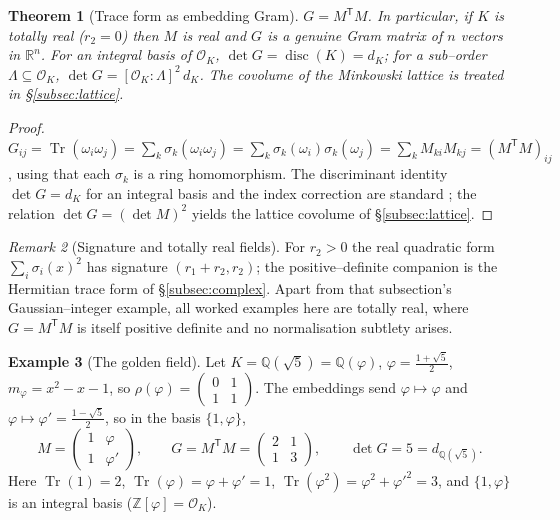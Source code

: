 \documentclass[11pt]{article}
\theoremstyle{plain}
\newtheorem{theorem}{Theorem}[section]
\theoremstyle{definition}
\newtheorem{example}[theorem]{Example}
\theoremstyle{remark}
\newtheorem{remark}[theorem]{Remark}
\newcommand{\Q}{\mathbb{Q}}
\newcommand{\Z}{\mathbb{Z}}
\newcommand{\R}{\mathbb{R}}
\newcommand{\K}{K}
\newcommand{\OK}{\mathcal{O}_K}
\newcommand{\Tr}{\operatorname{Tr}}
\newcommand{\GG}{G}
\newcommand{\transpose}{^{\mathsf{T}}}
\DeclareMathOperator{\disc}{disc}
\begin{document}
\begin{theorem}[Trace form as embedding Gram]\label{thm:GMM}
$\GG = M\transpose M$. In particular, if $\K$ is totally real ($r_2=0$) then $M$ is real and $\GG$ is a
genuine Gram matrix of $n$ vectors in $\R^n$. For an integral basis of $\OK$, $\det\GG=\disc(\K)=d_\K$; for
a sub--order $\Lambda\subseteq\OK$, $\det\GG=[\OK:\Lambda]^2\,d_\K$. The covolume of the Minkowski lattice is
treated in \S\ref{subsec:lattice}.
\end{theorem}
\begin{proof}
$\GG_{ij}=\Tr(\omega_i\omega_j)=\sum_k\sigma_k(\omega_i\omega_j)=\sum_k\sigma_k(\omega_i)\sigma_k(\omega_j)
=\sum_k M_{ki}M_{kj}=(M\transpose M)_{ij}$, using that each $\sigma_k$ is a ring homomorphism. The
discriminant identity $\det\GG=d_\K$ for an integral basis and the index correction are standard
\cite{Neukirch,Marcus}; the relation $\det\GG=(\det M)^2$ yields the lattice covolume of
\S\ref{subsec:lattice}.
\end{proof}

\begin{remark}[Signature and totally real fields]\label{rem:signature}
For $r_2>0$ the real quadratic form $\sum_i\sigma_i(x)^2$ has signature $(r_1+r_2,r_2)$; the
positive--definite companion is the Hermitian trace form of \S\ref{subsec:complex}. Apart from that
subsection's Gaussian--integer example, all worked examples here are totally real, where $\GG=M\transpose M$
is itself positive definite and no normalisation subtlety arises.
\end{remark}

\begin{example}[The golden field]\label{ex:golden}
Let $\K=\Q(\sqrt5)=\Q(\varphi)$, $\varphi=\tfrac{1+\sqrt5}2$, $m_\varphi=x^2-x-1$, so $\rho(\varphi)
=\left(\begin{smallmatrix}0&1\\1&1\end{smallmatrix}\right)$. The embeddings send $\varphi\mapsto\varphi$ and
$\varphi\mapsto\varphi'=\tfrac{1-\sqrt5}2$, so in the basis $\{1,\varphi\}$,
\[
  M=\begin{pmatrix}1&\varphi\\ 1&\varphi'\end{pmatrix},\qquad
  \GG=M\transpose M=\begin{pmatrix}2&1\\1&3\end{pmatrix},\qquad
  \det\GG=5=d_{\Q(\sqrt5)} .
\]
Here $\Tr(1)=2$, $\Tr(\varphi)=\varphi+\varphi'=1$, $\Tr(\varphi^2)=\varphi^2+\varphi'^2=3$, and
$\{1,\varphi\}$ is an integral basis ($\Z[\varphi]=\OK$).
\end{example}
\end{document}
